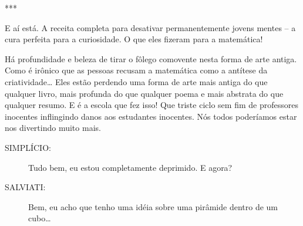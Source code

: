 \documentclass[a4paper,oneside,10pt,notitlepage]{article}
\begin{document}
\vspace{1em}

\begin{center}
***
\end{center}

\vspace{1em}

E aí está.
A receita completa para desativar permanentemente jovens mentes -- a cura perfeita para a curiosidade.
O que eles fizeram para a matemática!

Há profundidade e beleza de tirar o fôlego comovente nesta forma de arte antiga.
Como é irônico que as pessoas recusam a matemática como a antítese da criatividade\ldots
Eles estão perdendo uma forma de arte mais antiga do que qualquer livro, mais profunda do que qualquer poema e mais abstrata do que qualquer resumo.
E é a escola que fez isso!
Que triste ciclo sem fim de professores inocentes inflingindo danos aos estudantes inocentes.
Nós todos poderíamos estar nos divertindo muito mais.

\begin{description}
\item[SIMPLÍCIO:] Tudo bem, eu estou completamente deprimido. E agora?
\item[SALVIATI:] Bem, eu acho que tenho uma idéia sobre uma pirâmide dentro de um cubo\ldots
\end{description}
\end{document}
